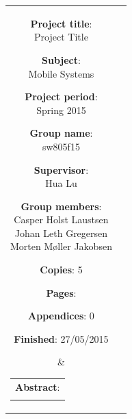     \begin{tabular}{cc}
	
        \parbox[3cm]{7cm}{ %
	\vspace{7mm}
            \begin{description}
                \item {\textbf{Project title}:} \\
                    Project Title
                    \hspace{4cm}
                \item {\textbf{Subject}:} \\
                    Mobile Systems
            \end{description}
	\vspace{-4mm}
            \parbox{8cm}{ %
                \begin{description}
                    \item {\textbf{Project period}:} \\
                        Spring 2015
                    \hspace{4cm}
                    \item {\textbf{Group name}:} \\
                        sw805f15
                    \hspace{4cm}
                    \item {\textbf{Supervisor}:} \\
                        Hua Lu
                    \item {\textbf{Group members}:}\\%
                    Casper Holst Laustsen\\[0.20cm]
                    Johan Leth Gregersen\\[0.20cm]
                    Morten Møller Jakobsen
                \end{description}
            }
	    \vspace{-4mm}
            \begin{description}
                \item {\textbf{Copies}:} 5
                \item {\textbf{Pages}:} \pageref{LastPage}
                \item {\textbf{Appendices}: 0} 
                \item {\textbf{Finished}: 27/05/2015} 
            \end{description}
            \vfill 
        } &
        \parbox{7cm}{ %
            \hfill %
            \begin{tabular}{l}%
                {\textbf{Abstract}:}\bigskip \\%
                \fbox{ %
                    \parbox{6.2cm}{\bigskip %
                    {\vfill{\small %
                     
                        \bigskip}}%
                    }}%
            \end{tabular}%
        }
    \end{tabular}

